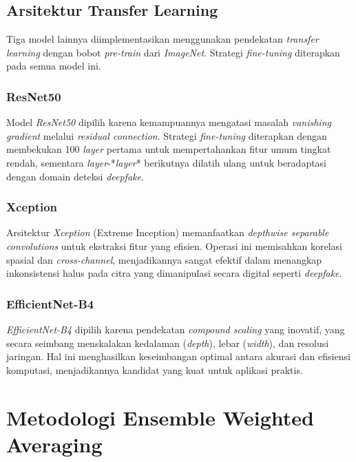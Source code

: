 \subsection{Arsitektur Transfer Learning}

Tiga model lainnya diimplementasikan menggunakan pendekatan \textit{transfer learning} dengan bobot \textit{pre-train} dari \textit{ImageNet}. Strategi \textit{fine-tuning} diterapkan pada semua model ini.

\subsubsection{ResNet50}
Model \textit{ResNet50} dipilih karena kemampuannya mengatasi masalah \textit{vanishing gradient} melalui \textit{residual connection}. Strategi \textit{fine-tuning} diterapkan dengan membekukan 100 \textit{layer} pertama untuk mempertahankan fitur umum tingkat rendah, sementara \textit{layer}-*\textit{layer}* berikutnya dilatih ulang untuk beradaptasi dengan domain deteksi \textit{deepfake}.

\subsubsection{Xception}
Arsitektur \textit{Xception} (Extreme Inception) memanfaatkan \textit{depthwise separable convolutions} untuk ekstraksi fitur yang efisien. Operasi ini memisahkan korelasi spasial dan \textit{cross-channel}, menjadikannya sangat efektif dalam menangkap inkonsistensi halus pada citra yang dimanipulasi secara digital seperti \textit{deepfake}.

\subsubsection{EfficientNet-B4}
\textit{EfficientNet-B4} dipilih karena pendekatan \textit{compound scaling} yang inovatif, yang secara seimbang menskalakan kedalaman (\textit{depth}), lebar (\textit{width}), dan resolusi jaringan. Hal ini menghasilkan keseimbangan optimal antara akurasi dan efisiensi komputasi, menjadikannya kandidat yang kuat untuk aplikasi praktis.

\section{Metodologi Ensemble Weighted Averaging}


